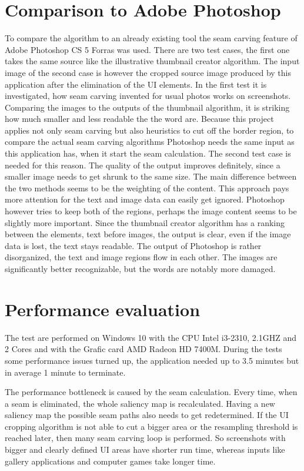 \documentclass[draft,final]{vutinfth} %
\begin{document}
	\section{Comparison to Adobe Photoshop} 
	To compare the algorithm to an already existing tool the seam carving feature of Adobe Photoshop CS 5 Forras was used.
	There are two test cases, the first one takes the same source like the illustrative thumbnail creator algorithm.
	The input image of the second case is however the cropped source image produced by this application after the elimination of the UI elements.
	In the first test it is investigated, how seam carving invented for usual photos works on screenshots.
	Comparing the images to the outputs of the thumbnail algorithm, it is striking how much smaller and less readable the the word are.
	Because this project applies not only seam carving but also heuristics to cut off the border region, to compare the actual seam carving algorithms Photoshop needs the same input as this application has, when it start the seam calculation.
	The second test case is needed for this reason.
	The quality of the output improves definitely, since a smaller image needs to get shrunk to the same size.
	The main difference between the two methods seems to be the weighting of the content.
	This approach pays more attention for the text and image data can easily get ignored.
	Photoshop however tries to keep both of the regions, perhaps the image content seems to be slightly more important.
	Since the thumbnail creator algorithm has a ranking between the elements, text before images, the output is clear, even if the image data is lost, the text stays readable.
	The output of Photoshop is rather disorganized, the text and image regions flow in each other.
	The images are significantly better recognizable, but the words are notably more damaged.  
	
	\section{Performance evaluation}
	The test are performed on Windows 10 with the CPU Intel i3-2310, 2.1GHZ and 2 Cores and with the Grafic card AMD Radeon HD 7400M.
	During the tests some performance issues turned up, the application needed up to 3.5 minutes but in average 1 minute  to terminate.\par 
	The performance bottleneck is caused by the seam calculation.
	Every time, when a seam is eliminated, the whole saliency map is recalculated.
	Having a new saliency map the possible seam paths also needs to get redetermined.
	If the UI cropping algorithm is not able to cut a bigger area or the resampling threshold is reached later, then many seam carving loop is performed. 
	So screenshots with bigger and clearly defined UI areas have shorter run time, whereas inputs like gallery applications and computer games take longer time. 
	
\end{document}
